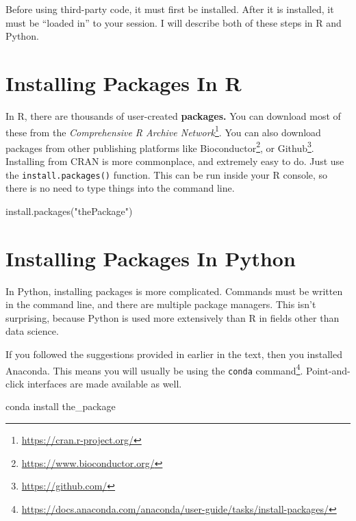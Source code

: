 \documentclass[
  12pt,
  krantz2]{krantz}
\makeatletter
\newenvironment{Shaded}{\begin{snugshade}}{\end{snugshade}}
\newcommand{\ExtensionTok}[1]{#1}
\newcommand{\FunctionTok}[1]{\textcolor[rgb]{0,0,0}{#1}}
\newcommand{\NormalTok}[1]{#1}
\newcommand{\StringTok}[1]{\textcolor[rgb]{0.5,0.5,0.5}{#1}}
\renewcommand{\href}[2]{#2\footnote{\url{#1}}}
\newenvironment{kframe}{%
\medskip{}
\setlength{\fboxsep}{.8em}
 \def\at@end@of@kframe{}%
 \ifinner\ifhmode%
  \def\at@end@of@kframe{\end{minipage}}%
  \begin{minipage}{\columnwidth}%
 \fi\fi%
 \def\FrameCommand##1{\hskip\@totalleftmargin \hskip-\fboxsep
 \colorbox{shadecolor}{##1}\hskip-\fboxsep
     \hskip-\linewidth \hskip-\@totalleftmargin \hskip\columnwidth}%
 \MakeFramed {\advance\hsize-\width
   \@totalleftmargin\z@ \linewidth\hsize
   \@setminipage}}%
 {\par\unskip\endMakeFramed%
 \at@end@of@kframe}
\renewenvironment{Shaded}{\begin{kframe}}{\end{kframe}}
\makeatother
\begin{document}
Before using third-party code, it must first be installed. After it is installed, it must be ``loaded in'' to your session. I will describe both of these steps in R and Python.

\hypertarget{installing-packages-in-r}{%
\section{Installing Packages In R}\label{installing-packages-in-r}}

In R, there are thousands of user-created \textbf{packages.} You can download most of these from the \href{https://cran.r-project.org/}{\emph{Comprehensive R Archive Network}}. You can also download packages from other publishing platforms like \href{https://www.bioconductor.org/}{Bioconductor}, or \href{https://github.com/}{Github}. Installing from CRAN is more commonplace, and extremely easy to do. Just use the \texttt{install.packages()} function. This can be run inside your R console, so there is no need to type things into the command line.

\begin{Shaded}
\begin{Highlighting}[]
\FunctionTok{install.packages}\NormalTok{(}\StringTok{"thePackage"}\NormalTok{)}
\end{Highlighting}
\end{Shaded}

\hypertarget{installing-packages-in-python}{%
\section{Installing Packages In Python}\label{installing-packages-in-python}}

In Python, installing packages is more complicated. Commands must be written in the command line, and there are multiple package managers. This isn't surprising, because Python is used more extensively than R in fields other than data science.

If you followed the suggestions provided in earlier in the text, then you installed Anaconda. This means you will usually be using the \href{https://docs.anaconda.com/anaconda/user-guide/tasks/install-packages/}{\texttt{conda} command}. Point-and-click interfaces are made available as well.

\begin{Shaded}
\begin{Highlighting}[]
\ExtensionTok{conda}\NormalTok{ install the\_package}
\end{Highlighting}
\end{Shaded}
\end{document}
